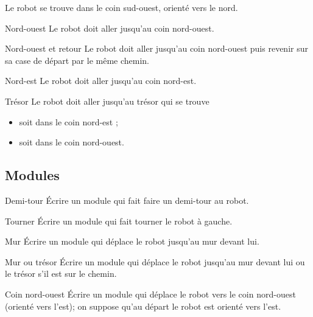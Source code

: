 		Le robot se trouve dans le coin sud-ouest, orienté vers le nord.

		\begin{Exercice}{Nord-ouest}
			Le robot doit aller jusqu'au coin nord-ouest.
		\end{Exercice}

		\begin{Exercice}{Nord-ouest et retour}
			Le robot doit aller jusqu'au coin nord-ouest
			puis revenir sur sa case de départ par le même chemin.
		\end{Exercice}

		\begin{Exercice}{Nord-est}
			Le robot doit aller jusqu'au coin nord-est.
		\end{Exercice}

		\begin{Exercice}{Trésor}
			Le robot doit aller jusqu'au trésor qui se trouve
			\begin{itemize}
			\item soit dans le coin nord-est ;
			\item soit dans le coin nord-ouest.
			\end{itemize}
		\end{Exercice}

	\subsection{Modules}

		\begin{Exercice}{Demi-tour}
			Écrire un module qui fait faire un demi-tour au robot.
		\end{Exercice}

		\begin{Exercice}{Tourner}
			Écrire un module qui fait tourner le robot à gauche.
		\end{Exercice}

		\begin{Exercice}{Mur}
			Écrire un module qui déplace le robot
			jusqu'au mur devant lui.
		\end{Exercice}

		\begin{Exercice}{Mur ou trésor}
			Écrire un module qui déplace le robot jusqu'au mur
			devant lui ou le trésor s'il est sur le chemin.
		\end{Exercice}

		\begin{Exercice}{Coin nord-ouest}
			Écrire un module qui déplace le robot vers le coin nord-ouest 
			(orienté vers l'est); on suppose qu'au départ
			le robot est orienté vers l'est.
		\end{Exercice}

